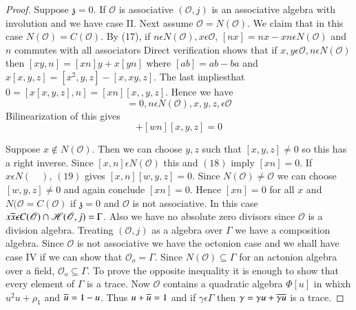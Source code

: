 \begin{proof}
Suppose $\mathfrak{z}=0$. If $\mathscr{O}$ is associative
$(\mathscr{O},j)$ is an associative algebra with involution and we
have case II. Next assume $\mathscr{O}=N(\mathscr{O})$. We claim that
in this case $N(\mathscr{O})=C(\mathscr{O})$. By (17), if $n\epsilon
N(\mathscr{O}),x\epsilon \mathscr{O}$, $[nx]=nx-xn\epsilon
N(\mathscr{O})$ and $n$ commutes with all associators Direct
verification shows that if $x,y\epsilon \mathscr{O},n\epsilon
N(\mathscr{O})$ then $[xy,n]=[xn]y+x[yn]$ where $[ab]=ab-ba$ and
$x[x,y,z]=[x^{2},y,z]-[x,xy,z]$. The last implies\pageoriginale that
$0=[x[x,y,z],n]=[xn][x,,y,z]$. Hence we have
\begin{equation*}
  [xn][x,y,z]=0,n\epsilon N(\mathscr{O}),x,y,z,\epsilon
  \mathscr{O}\tag{18}\label{c3:eq18}
\end{equation*}
Bilinearization of this gives
\begin{equation*}
  [xn][w,y,z]+[wn][x,y,z]=0\tag{19}\label{c3:eq19}
\end{equation*}

Suppose $x\notin N(\mathscr{O})$. Then we can choose $y,z$ such that
$[x,y,z]\neq0$ so this has a right inverse. Since $[x,n]\epsilon
N(\mathscr{O})$ this and $(18)$ imply $[xn]=0$. If $x\epsilon
N(\quad)$, $(19)$ gives $[x,n][w,y,z]=0$. Since $N(\mathscr{O})\neq
\mathscr{O}$ we can choose $[w,y,z]\neq 0$ and again conclude
$[xn]=0$. Hence $[xn]=0$ for all $x$ and $N(\mathscr{O}=C(\mathscr{O})$
if $\mathfrak{z}=0$ and $\mathscr{O}$ is not associative. In this case
$x\overline{x}\epsilon C(\mathscr{O})\cap
\mathscr{H}(\mathscr{O},j)=\Gamma$. Also we have no absolute zero
divisors since $\mathscr{O}$ is a division algebra. Treating
$(\mathscr{O},j)$ as a algebra over $\Gamma$ we have a composition
algebra. Since $\mathscr{O}$ is not associative we have the octonion
case and we shall have case IV if we can show that
$\mathscr{O}_o=\Gamma$. Since $N(\mathscr{O})\subseteq \Gamma$ for an
actonion algebra over a field, $\mathscr{O}_o\subseteq \Gamma$. To
prove the opposite inequality it is enough to show that every element
of $\Gamma$ is a trace. Now $\mathcal{O}$ contains a quadratic
algebra $\Phi[u]$ in whixh $u^{2}u+\rho_1$ and $\overline{u}=1-u$. Thus
$u+\overline{u}=1$ and if $\gamma \epsilon \Gamma$ then $\gamma =\gamma
u+\overline{\gamma u}$ is a trace.


\end{proof}
